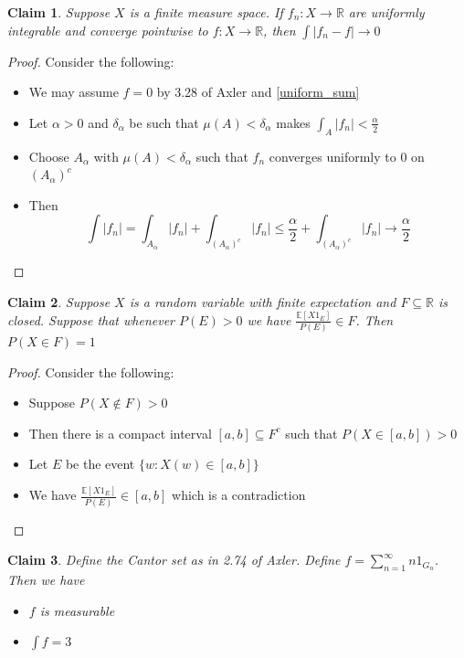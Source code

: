 \documentclass[a4paper,11pt]{article}
\newtheorem{claim}{Claim}
\begin{document}
\begin{claim}
  Suppose $X$ is a finite measure space.
  If $f_n:X \to \mathbb{R}$ are uniformly integrable and converge pointwise to $f:X \to \mathbb{R}$, then $\int |f_n-f| \to 0$
\end{claim}

\begin{proof}
  Consider the following:
  \begin{itemize}
    \item We may assume $f=0$ by 3.28 of Axler and \ref{uniform_sum}
    \item Let $\alpha > 0$ and $\delta_\alpha$ be such that $\mu(A)<\delta_\alpha$ makes $\int_A |f_n|<\frac{\alpha}{2}$
    \item Choose $A_\alpha$ with $\mu(A)<\delta_\alpha$ such that $f_n$ converges uniformly to $0$ on $(A_\alpha)^c$
    \item Then \[\int |f_n| = \int_{A_\alpha} |f_n| + \int_{(A_\alpha)^c} |f_n| \leq \frac{\alpha}{2} + \int_{(A_\alpha)^c} |f_n| \to \frac{\alpha}{2}\]
  \end{itemize}
\end{proof}



\begin{claim}
  Suppose $X$ is a random variable with finite expectation and $F \subseteq \mathbb{R}$ is closed.
  Suppose that whenever $P(E)>0$ we have $\frac{\mathbb{E}[X1_E]}{P(E)} \in F$. Then $P(X \in F)=1$
\end{claim}

\begin{proof}
  Consider the following:
  \begin{itemize}
    \item Suppose $P(X \notin F)>0$
    \item Then there is a compact interval $[a,b] \subseteq F^c$ such that $P(X \in [a,b])>0$
    \item Let $E$ be the event $\{w: X(w) \in [a,b]\}$
    \item We have $\frac{\mathbb{E}[X1_E]}{P(E)} \in [a,b]$ which is a contradiction
  \end{itemize}
\end{proof}

\begin{claim}
  Define the Cantor set as in 2.74 of Axler. Define $f=\sum_{n=1}^\infty n1_{G_n}$. Then we have
  \begin{itemize}
    \item $f$ is measurable
    \item $\int f = 3$
  \end{itemize}
\end{claim}
\end{document}
